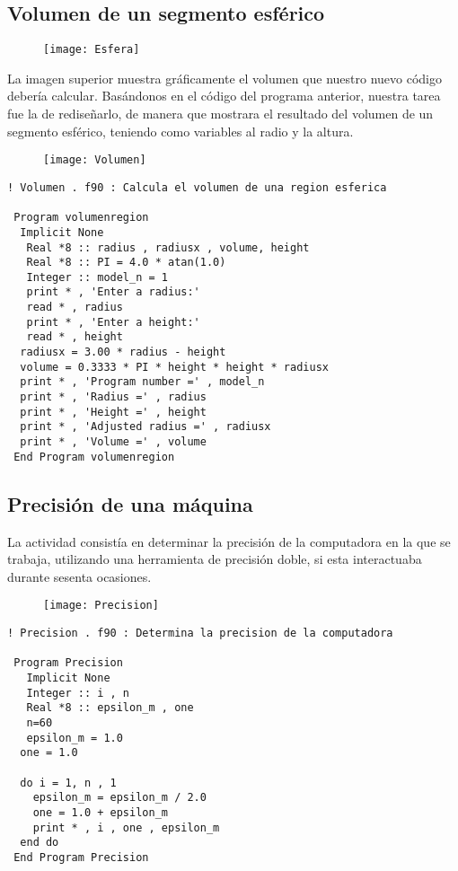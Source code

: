 \documentclass[12pt]{article}
\begin{document}
\subsection{Volumen de un segmento esférico}
\begin{figure}[H]
	\centering
    \texttt{[image: Esfera]}
\end{figure}
La imagen superior muestra gráficamente el volumen que nuestro nuevo código debería calcular. Basándonos en el código del programa anterior, nuestra tarea fue la de rediseñarlo, de manera que mostrara el resultado del volumen de un segmento esférico, teniendo como variables al radio y la altura. 

\begin{figure}[H]
	\centering
    \texttt{[image: Volumen]}
\end{figure}

\begin{verbatim}! Volumen . f90 : Calcula el volumen de una region esferica

 Program volumenregion
  Implicit None 
   Real *8 :: radius , radiusx , volume, height 
   Real *8 :: PI = 4.0 * atan(1.0)
   Integer :: model_n = 1 
   print * , 'Enter a radius:' 
   read * , radius 
   print * , 'Enter a height:'
   read * , height
  radiusx = 3.00 * radius - height
  volume = 0.3333 * PI * height * height * radiusx 
  print * , 'Program number =' , model_n 
  print * , 'Radius =' , radius 
  print * , 'Height =' , height
  print * , 'Adjusted radius =' , radiusx 
  print * , 'Volume =' , volume 
 End Program volumenregion 
\end{verbatim}

\subsection{Precisión de una máquina}
La actividad consistía en determinar la precisión de la computadora en la que se trabaja, utilizando una herramienta de precisión doble, si esta interactuaba durante sesenta ocasiones. 

\begin{figure}[H]
	\centering
    \texttt{[image: Precision]}
\end{figure}

\begin{verbatim}! Precision . f90 : Determina la precision de la computadora

 Program Precision
   Implicit None
   Integer :: i , n
   Real *8 :: epsilon_m , one
   n=60 
   epsilon_m = 1.0
  one = 1.0
  
  do i = 1, n , 1 
    epsilon_m = epsilon_m / 2.0 
    one = 1.0 + epsilon_m 
    print * , i , one , epsilon_m 
  end do 
 End Program Precision\end{verbatim}
\end{document}
